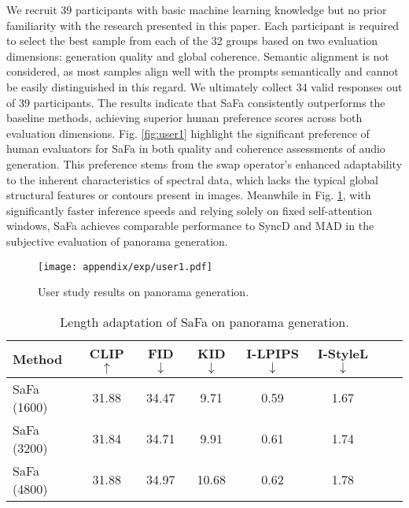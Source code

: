 We recruit 39 participants with basic machine learning knowledge but no prior familiarity with the research presented in this paper. Each participant is required to select the best sample from each of the 32 groups based on two evaluation dimensions: generation quality and global coherence. Semantic alignment is not considered, as most samples align well with the prompts semantically and cannot be easily distinguished in this regard. We ultimately collect 34 valid responses out of 39 participants. The results indicate that SaFa consistently outperforms the baseline methods, achieving superior human preference scores across both evaluation dimensions. Fig. \ref{fig:user1} highlight the significant preference of human evaluators for SaFa in both quality and coherence assessments of audio generation. This preference stems from the swap operator's enhanced adaptability to the inherent characteristics of spectral data, which lacks the typical global structural features or contours present in images. Meanwhile in Fig. \ref{fig:user3}, with significantly faster inference speeds and relying solely on fixed self-attention windows, SaFa achieves comparable performance to SyncD and MAD in the subjective evaluation of panorama generation.

\begin{figure}[t]
    \centering
    \texttt{[image: appendix/exp/user1.pdf]}
    \vspace{-10pt}
    \caption{User study results on panorama generation.}
    \vspace{-5pt}
\label{fig:user3}
\end{figure}

\begin{table}[!t]
\centering
\setlength{\tabcolsep}{0.5mm}
\begin{tabular}{lccccccc}
\toprule[1pt]
\textbf{Method}                  & \textbf{CLIP} $\uparrow$  & \textbf{FID} $\downarrow$ & \textbf{KID} $\downarrow$ & \textbf{I-LPIPS} $\downarrow$ & \textbf{I-StyleL} $\downarrow$ \\ \hline
SaFa (1600)          & 31.88                   & 34.47  & 9.71    & 0.59          & 1.67       \\
SaFa (3200)          & 31.84                  & 34.71    & 9.91   & 0.61         & 1.74        \\
SaFa (4800)          & 31.88                  & 34.97    & 10.68    & 0.62         & 1.78        \\
\bottomrule[1pt]
\end{tabular}

\vspace{-5pt}
\caption{Length adaptation of SaFa on panorama generation.}
\vspace{-15pt}
\label{tab:length}
\end{table}


